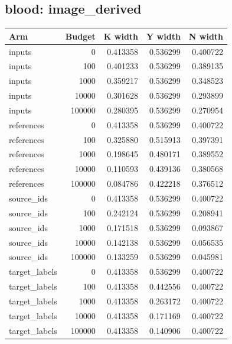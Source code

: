 \reservetable
\subsection{blood: image\_derived}

\begingroup\small
\setlength{\tabcolsep}{4pt}
\begin{longtable}{lrrrr}
\toprule

Arm & Budget & K width & Y width & N width\\\midrule\endhead

inputs & 0 & 0.413358 & 0.536299 & 0.400722\\

inputs & 100 & 0.401233 & 0.536299 & 0.389135\\

inputs & 1000 & 0.359217 & 0.536299 & 0.348523\\

inputs & 10000 & 0.301628 & 0.536299 & 0.293899\\

inputs & 100000 & 0.280395 & 0.536299 & 0.270954\\

references & 0 & 0.413358 & 0.536299 & 0.400722\\

references & 100 & 0.325880 & 0.515913 & 0.397391\\

references & 1000 & 0.198645 & 0.480171 & 0.389552\\

references & 10000 & 0.110593 & 0.439136 & 0.380568\\

references & 100000 & 0.084786 & 0.422218 & 0.376512\\

source\_ids & 0 & 0.413358 & 0.536299 & 0.400722\\

source\_ids & 100 & 0.242124 & 0.536299 & 0.208941\\

source\_ids & 1000 & 0.171518 & 0.536299 & 0.093867\\

source\_ids & 10000 & 0.142138 & 0.536299 & 0.056535\\

source\_ids & 100000 & 0.133259 & 0.536299 & 0.045981\\

target\_labels & 0 & 0.413358 & 0.536299 & 0.400722\\

target\_labels & 100 & 0.413358 & 0.442556 & 0.400722\\

target\_labels & 1000 & 0.413358 & 0.263172 & 0.400722\\

target\_labels & 10000 & 0.413358 & 0.171169 & 0.400722\\

target\_labels & 100000 & 0.413358 & 0.140906 & 0.400722\\

\bottomrule
\end{longtable}
\endgroup

